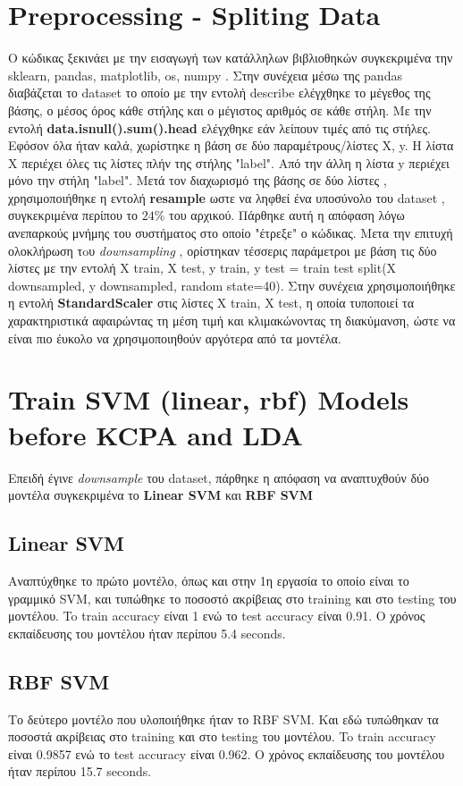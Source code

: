 \section{Preprocessing - Spliting Data}

Ο κώδικας ξεκινάει με την εισαγωγή των κατάλληλων βιβλιοθηκών συγκεκριμένα την
sklearn, pandas, matplotlib, os, numpy . Στην συνέχεια μέσω της pandas διαβάζεται
το dataset το οποίο με την εντολή describe ελέγχθηκε το μέγεθος της βάσης, ο μέσος
όρος κάθε στήλης και ο μέγιστος αριθμός σε κάθε στήλη. Με την εντολή \textbf{data.isnull().sum().head}
ελέγχθηκε εάν λείπουν τιμές από τις στήλες. Εφόσον όλα ήταν καλά, χωρίστηκε η βάση
σε δύο παραμέτρους/λίστες X, y. Η λίστα X περιέχει όλες τις λίστες πλήν της στήλης
"label". Από την άλλη η λίστα y περιέχει μόνο την στήλη "label". Μετά τον διαχωρισμό
της βάσης σε δύο λίστες , χρησιμοποιήθηκε η εντολή \textbf{resample} ωστε να ληφθεί ένα υποσύνολο του dataset , συγκεκριμένα περίπου το $24\%$ του αρχικού. Πάρθηκε αυτή η απόφαση λόγω ανεπαρκούς μνήμης του συστήματος στο οποίο "έτρεξε" ο κώδικας. 
Mετα την επιτυχή ολοκλήρωση τoυ \emph{downsampling} , ορίστηκαν
τέσσερις παράμετροι με βάση τις δύο λίστες με την εντολή X train, X test, y train, y
test = train test split(X downsampled, y downsampled, random state=40).
Στην συνέχεια χρησιμοποιήθηκε η εντολή \textbf{StandardScaler} στις λίστες Χ train, X test, η οποία τυποποιεί  τα χαρακτηριστικά αφαιρώντας τη μέση τιμή και κλιμακώνοντας τη διακύμανση, ώστε να είναι πιο έυκολο να χρησιμοποιηθούν αργότερα από τα μοντέλα. 

\section{Train SVM (linear, rbf) Models before KCPA and LDA}

Επειδή έγινε \emph{downsample} του dataset, πάρθηκε η απόφαση να αναπτυχθούν δύο μοντέλα συγκεκριμένα το \textbf{Linear SVM} και \textbf{RBF SVM}

\subsection{Linear SVM}
Αναπτύχθηκε το πρώτο μοντέλο, όπως και στην 1η εργασία το οποίο είναι το γραμμικό SVM, και
τυπώθηκε το ποσοστό ακρίβειας στο training και στο testing του μοντέλου. To train accuracy είναι 1 ενώ το test
accuracy είναι 0.91. Ο χρόνος εκπαίδευσης του μοντέλου ήταν περίπου 5.4 seconds.

\subsection{RBF SVM}
Το δεύτερο μοντέλο που υλοποιήθηκε ήταν το RBF SVM. Και εδώ τυπώθηκαν τα ποσοστά
ακρίβειας στο training και στο testing του μοντέλου. To train accuracy είναι 0.9857 ενώ το test accuracy είναι 0.962. Ο χρόνος εκπαίδευσης του μοντέλου ήταν περίπου 15.7 seconds.

